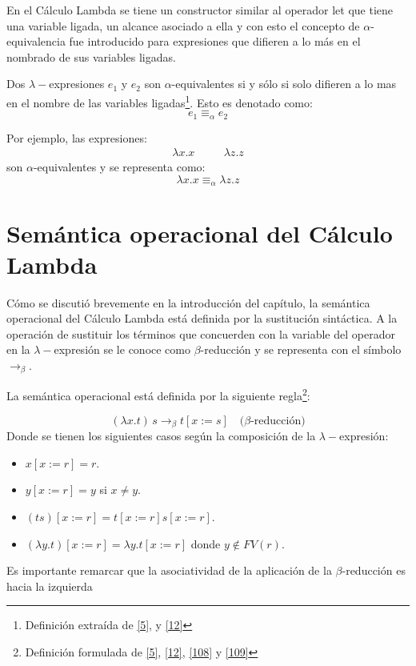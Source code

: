     En el Cálculo Lambda se tiene un constructor similar al operador \textsf{let} que tiene una variable ligada, un alcance asociado a ella y con esto el concepto de $\alpha$-equivalencia fue introducido para expresiones que difieren a lo más en el nombrado de sus variables ligadas. 
    \begin{definition}  Dos $\lambda-$expresiones $e_1$ y $e_2$ son $\alpha$-equivalentes si y sólo si solo difieren a lo mas en el nombre de las variables ligadas\footnote{Definición extraída de  \hyperlink{5}{[5]},  y  \hyperlink{12}{[12]}}. Esto es denotado como: $$e_1 \equiv_{\alpha} e_2 $$

     Por ejemplo, las expresiones:
    \[
        \begin{array}{ccc}
        \lambda x.x &\quad& \lambda z.z
        \end{array}
    \]
    \noindent
    son $\alpha$-equivalentes y se representa como: $$\lambda x.x\equiv_{\alpha}\lambda z.z$$
    \end{definition}


    \section{Semántica operacional del Cálculo Lambda}
    Cómo se discutió brevemente en la introducción del capítulo, la semántica operacional del Cálculo Lambda está definida por la sustitución sintáctica. 
A la operación de sustituir los términos que concuerden con la variable del operador en la $\lambda-$expresión se le conoce como $\beta$-reducción y se representa con el símbolo $\to_\beta$. 


    \begin{definition} La semántica operacional está definida por la siguiente regla\footnote{Definición formulada de \hyperlink{5}{[5]},  \hyperlink{12}{[12]},  \hyperlink{108}{[108]} y  \hyperlink{109}{[109]}}: 

    $$(\lambda x.t)\,s \to_\beta t[x:=s] \quad \text{($\beta$-reducción)}$$
    Donde se tienen los siguientes casos según la composición de la $\lambda-$expresión:\\
        \begin{itemize}
        \item $x[x:=r] = r$. 
        \item $y[x:=r] = y$ si $x\neq y$.
        \item $(ts)[x:=r] = t[x:=r]s[x:=r]$.
        \item $(\lambda y.t)[x:=r] = \lambda y.t[x:=r]$ donde $y\notin FV(r)$.
        \end{itemize}
	\bigskip
	Es importante remarcar que la asociatividad de la aplicación de la $\beta$-reducción es hacia la izquierda
    \end{definition}
    
